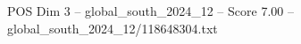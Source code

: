 \begin{textsample}{POS Dim 3 – global\_south\_2024\_12 – Score 7.00 – global\_south\_2024\_12/118648304.txt}
\end{textsample}
